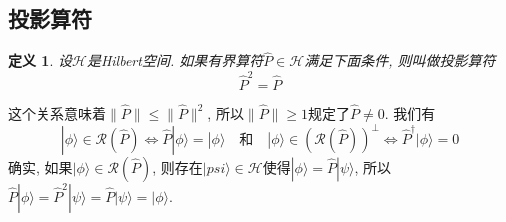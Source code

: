 \documentclass[a4paper,11pt]{book}
\newtheorem{definition}{\hspace{2em}定义}[section]
\begin{document}
\subsection{投影算符}
\begin{definition}
  设$\mathcal{H}$是Hilbert空间. 如果有界算符$\hat{P}\in\mathcal{H}$满足下面条件, 则叫做投影算符
\begin{equation*}
  \hat{P}^2=\hat{P}
\end{equation*}
\end{definition}
这个关系意味着$\|\hat{P}\|\leq\|\hat{P}\|^2$, 所以$\|\hat{P}\|\geq1$规定了$\hat{P}\neq
0$. 我们有
\begin{equation}\label{projection operator}
  |\phi\rangle\in\mathcal{R}(\hat{P})\Longleftrightarrow\hat{P}|\phi\rangle=|\phi\rangle\quad\text{和}\quad|\phi\rangle\in(\mathcal{R}(\hat{P}))^{\perp}\Longleftrightarrow\hat{P}^{\dag}|\phi\rangle=0
\end{equation}
确实, 如果$|\phi\rangle\in\mathcal{R}(\hat{P})$, 则存在$|psi\rangle\in\mathcal{H}$使得$|\phi\rangle=\hat{P}|\psi\rangle$, 所以$\hat{P}|\phi\rangle=\hat{P}^2|\psi\rangle=\hat{P}|\psi\rangle=|\phi\rangle$.
\end{document}
